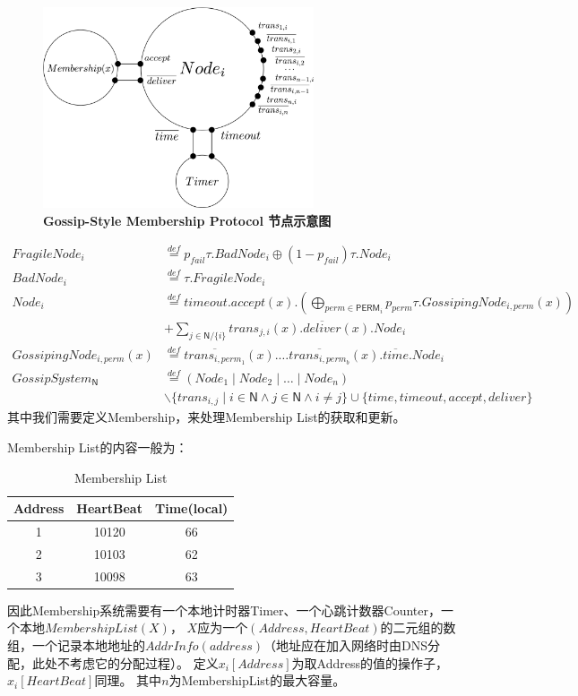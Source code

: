 \begin{figure}[!htbp]
	\small
	\centering
	\includegraphics[width=8cm]{../figure/Node_membership.png}
    \caption{\textbf{Gossip-Style Membership Protocol 节点示意图}}
    \label{fig_membership_node}
\end{figure}
\begin{align*}
    FragileNode_i&\stackrel{def}{=}p_{fail}\tau.BadNode_i\oplus (1-p_{fail})\tau.Node_i\\
    BadNode_i&\stackrel{def}{=}\tau.FragileNode_i\\
    Node_i&\stackrel{def}{=}timeout.accept(x).(\bigoplus_{perm\in \mathsf{PERM}_i} p_{perm}\tau.GossipingNode_{i,perm}(x))\\
     &+\sum_{j\in \mathsf{N}/\{i\}}trans_{j,i}(x).\overline{deliver}(x).Node_i\\
    GossipingNode_{i,perm}(x)&\stackrel{def}{=}\overline{trans_{i,perm_{1}}}(x).\dots \overline{trans_{i,perm_{b}}}(x).\overline{time}.Node_i\\
    GossipSystem_\mathsf{N}&\stackrel{def}{=}(Node_1\mid Node_2\mid \dots \mid Node_n)\\
    &\backslash \{trans_{i,j}\mid i\in \mathsf{N} \wedge j\in \mathsf{N} \wedge i\neq j\}\cup \{time, timeout, accept, deliver\}
 \end{align*}
 其中我们需要定义Membership，来处理Membership List的获取和更新。

Membership List的内容一般为：
\begin{table}[!hpt]
    \caption[Membership List]{Membership List\footnotemark}
    \label{tab:firstone}
    \centering
    \begin{tabular}{@{}ccc@{}} \toprule
      Address & HeartBeat & Time(local) \\ \midrule
      1 & 10120 & 66\\
      2 & 10103 & 62\\
      3 & 10098 & 63\\ \bottomrule
    \end{tabular}
  \end{table}
因此Membership系统需要有一个本地计时器Timer、一个心跳计数器Counter，一个本地$MembershipList(X)$，
$X$应为一个$(Address, HeartBeat)$的二元组的数组，一个记录本地地址的$AddrInfo(address)$（地址应在加入网络时由DNS分配，此处不考虑它的分配过程）。
定义$x_i[Address]$为取Address的值的操作子，$x_i[HeartBeat]$同理。
其中$n$为MembershipList的最大容量。

